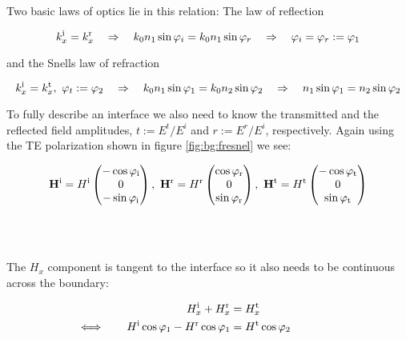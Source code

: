 Two basic laws of optics lie in this relation: The law of reflection

\begin{equation}
    k^{\mathrm{i}}_x = k^{\mathrm{r}}_x
    \quad \Rightarrow \quad
    k_0 n_1 \sin \varphi_i =  k_0 n_1 \sin \varphi_r
    \quad \Rightarrow \quad
    \varphi_i = \varphi_r := \varphi_1
\end{equation}

and the Snells law of refraction

\begin{equation}
    k^{\mathrm{i}}_x = k^{\mathrm{t}}_x, \
    \varphi_t := \varphi_2
    \quad \Rightarrow \quad
    k_0 n_1 \sin \varphi_1 =  k_0 n_2 \sin \varphi_2
    \quad \Rightarrow \quad
    n_1 \sin \varphi_1 = n_2 \sin \varphi_2
\end{equation}

To fully describe an interface we also need to know the transmitted and the reflected field amplitudes,  
$t := E^t / E^i$ 
and 
$r := E^r / E^i$, 
respectively.
Again using the TE polarization shown in figure \ref{fig:bg:fresnel} we see:

\begin{equation} \label{eq:bg:H}
    \vb H^{\mathrm{i}} = H^{\mathrm{i}}
    \begin{pmatrix}
        -\cos \varphi_{\mathrm{i}}\\ 0\\ -\sin \varphi_{\mathrm{i}}
    \end{pmatrix}
    , \
    \vb H^{\mathrm{r}} = H^{\mathrm{r}}
    \begin{pmatrix}
        \cos \varphi_{\mathrm{r}} \\ 0\\ \sin \varphi_{\mathrm{r}}
    \end{pmatrix}
    , \
    \vb H^{\mathrm{t}} = H^{\mathrm{t}}
    \begin{pmatrix}
        -\cos \varphi_{\mathrm{t}}\\ 0\\ \sin \varphi_{\mathrm{t}}
    \end{pmatrix}
\end{equation}
\\
\\
\\

The $H_x$ component is tangent to the interface so it also needs to be continuous across the boundary:

\begin{equation}\label{eq:bg:Hx}
\begin{aligned}
     H^{\mathrm{i}}_x +  H^{\mathrm{r}}_x &=  H^{\mathrm{t}}_x \\
    \Longleftrightarrow \qquad
    H^{\mathrm{i}} \cos \varphi_1 - H^{\mathrm{r}} \cos \varphi_1 &= H^{\mathrm{t}} \cos \varphi_2
    \qquad  \qquad
\end{aligned}
\end{equation}

